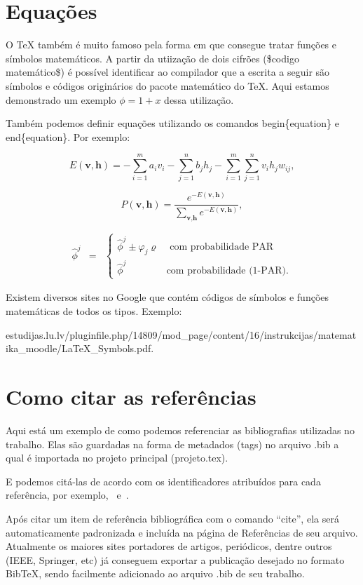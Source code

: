 \section{Equações}
\label{s.equacoes}

O TeX também é muito famoso pela forma em que consegue tratar funções e símbolos matemáticos. A partir da utiização de dois cifrões (\$codigo matemático\$) é possível identificar ao compilador que a escrita a seguir são símbolos e códigos originários do pacote matemático do TeX. Aqui estamos demonstrado um exemplo $\phi = 1 + x$ dessa utilização.

Também podemos definir equações utilizando os comandos begin\{equation\} e end\{equation\}. Por exemplo:

\begin{equation}
\label{e.energy_rbm}
E(\textbf{v},\textbf{h})=-\sum_{i=1}^ma_iv_i-\sum_{j=1}^nb_jh_j-\sum_{i=1}^m\sum_{j=1}^nv_ih_jw_{ij},
\end{equation}

\begin{equation}
\label{e.probability_configuration}
P(\textbf{v},\textbf{h})=\frac{e^{-E(\textbf{v},\textbf{h})}}{\displaystyle\sum_{\textbf{v},\textbf{h}}e^{-E(\textbf{v},\textbf{h})}},
\end{equation}

\begin{eqnarray}
\label{eq:par}
\hat{\phi}^j & = & \left\{ \begin{array}{ll} \hat{\phi}^j\pm \varphi_j \varrho  & \mbox{{ com probabilidade PAR}} \\
    \hat{\phi}^j & \mbox{{com probabilidade (1-PAR).}}
\end{array}\right.
\end{eqnarray}

Existem diversos sites no Google que contém códigos de símbolos e funções matemáticas de todos os tipos. Exemplo:\\
\begin{center}
\tiny estudijas.lu.lv/pluginfile.php/14809/mod\_page/content/16/instrukcijas/matematika\_moodle/LaTeX\_Symbols.pdf.
\end{center}

\section{Como citar as referências}
\label{ss.referencias}

Aqui está um exemplo de como podemos referenciar as bibliografias utilizadas no trabalho. Elas são guardadas na forma de metadados (tags) no arquivo .bib a qual é importada no projeto principal (projeto.tex).

E podemos citá-las de acordo com os identificadores atribuídos para cada referência, por exemplo,~\cite{stonebraker93} e~\cite{rocha09}.

Após citar um item de referência bibliográfica com o comando ``cite'', ela será automaticamente padronizada e incluída na página de Referências de seu arquivo. Atualmente os maiores sites portadores de artigos, periódicos, dentre outros (IEEE, Springer, etc) já conseguem exportar a publicação desejado no formato BibTeX, sendo facilmente adicionado ao arquivo .bib de seu trabalho.
